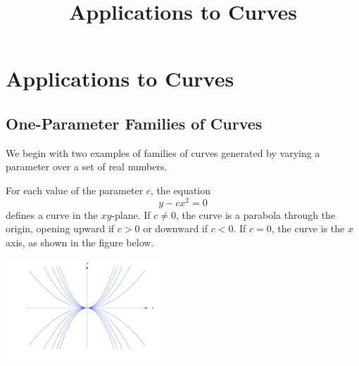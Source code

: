 \documentclass{ximera}
\title{Applications to Curves}
\begin{document}
\begin{abstract}

\end{abstract}

\maketitle



\section*{Applications to Curves}

\subsection*{One-Parameter Families of Curves}

We begin with two examples of families of curves generated by varying a parameter over a set of real numbers.

\begin{example}\label{example:4.5.1}
For each value of the parameter $c$, the equation
\begin{equation} \label{eq:4.5.1}
y-cx^2=0
\end{equation}
defines a curve in the $xy$-plane. If $c \neq 0$, the curve is a
parabola through the origin, opening upward if $c>0$ or downward if
$c<0$.   If $c=0$, the curve is the $x$ axis, as shown in the figure below.

\begin{image}
  \includegraphics[height=1.5in]{fig040501.jpg} 
\end{image}

\end{example}
\end{document}
